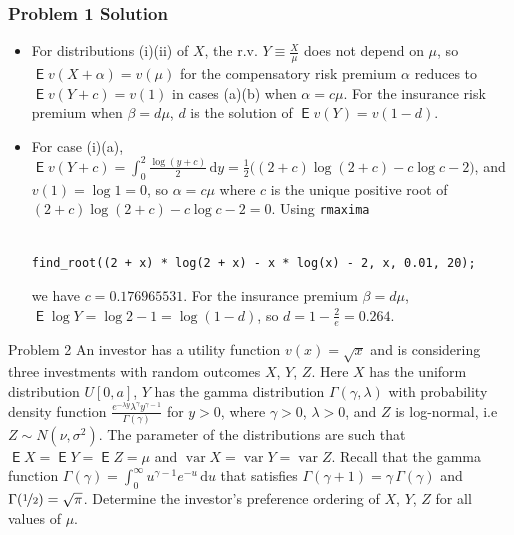 \documentclass[10pt]{beamer}
\newcommand{\ds}{\displaystyle}
\DeclareMathOperator\expc{\mathsf{E}}
\DeclareMathOperator\var{var}
\theoremstyle{definition}
\begin{document}
\begin{frame}[fragile]
  \frametitle{Problem 1 Solution}
  \begin{itemize}[<+->]
    \item For distributions (i)(ii) of $X$, the r.v. $\ds Y\equiv\frac{X}{\mu}$ does not depend on $\mu$, so $\ds\expc v(X + \alpha) = v(\mu)$ for the compensatory risk premium $\alpha$ reduces to $\ds\expc v(Y + c) = v(1)$ in cases (a)(b) when $\alpha=c\mu$. For the insurance risk premium when $\beta = d\mu$, $d$ is the solution of $\expc v(Y) = v(1 - d)$.
    \item For case (i)(a), $\ds\expc v(Y + c) = \int_0^2\frac{\log(y + c)}{2}\,\text{d}y = \frac{1}{2}\big((2 + c)\log(2 + c) - c\log c - 2\big)$, and $v(1) = \log 1 = 0$, so $\alpha = c\mu$ where $c$ is the unique positive root of $(2 + c)\log(2 + c) - c\log c - 2 = 0$. Using {\tt rmaxima}
\begin{verbatim}

find_root((2 + x) * log(2 + x) - x * log(x) - 2, x, 0.01, 20);

\end{verbatim}
  we have $c = 0.176965531$. For the insurance premium $\beta = d\mu$, $\ds\expc\log Y = \log 2 - 1 = \log(1 - d)$, so $\ds d = 1 - \frac{2}{e} = 0.264$.
  \end{itemize}
\end{frame}

\begin{frame}{Problem 2}
  An investor has a utility function $v(x) = \sqrt{x}$ and is considering three investments with random outcomes $X$, $Y$, $Z$. Here $X$ has the uniform distribution $U[0, a]$, $Y$ has the gamma distribution $\Gamma(\gamma,\lambda)$ with probability density function $\ds\frac{e^{-\lambda y}\lambda^\gamma y^{\gamma - 1}}{\Gamma(\gamma)}$ for $y > 0$, where $\gamma > 0$, $\lambda > 0$, and $Z$ is log-normal, i.e $Z\sim N(\nu, \sigma^2)$. The parameter of the distributions are such that $\expc X = \expc Y = \expc Z = \mu$ and $\var X = \var Y = \var Z$. Recall that the gamma function $\ds\Gamma(\gamma) = \int_0^\infty u^{\gamma - 1} e^{-u}\,\text{d}u$ that satisfies $\Gamma(\gamma + 1) = \gamma\,\Gamma(\gamma)$ and $\Gamma(\nicefrac{1}{2}) = \sqrt{\pi}$. Determine the investor's preference ordering of $X$, $Y$, $Z$ for all values of $\mu$.
\end{frame}
\end{document}
